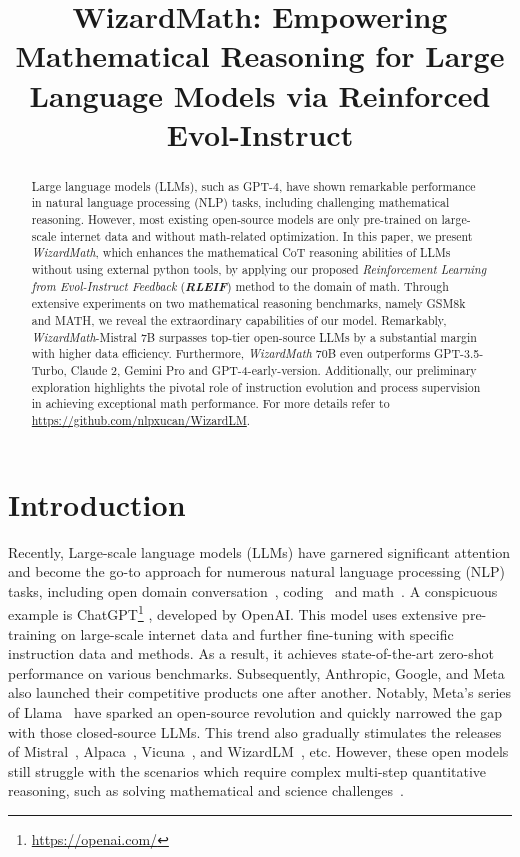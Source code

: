 \title{WizardMath: Empowering Mathematical Reasoning for Large Language Models via Reinforced Evol-Instruct}

\begin{abstract}
Large language models (LLMs), such as GPT-4, have shown remarkable performance in natural language processing (NLP) tasks, including challenging mathematical reasoning. However, most existing open-source models are only pre-trained on large-scale internet data and without math-related optimization. In this paper, we present \emph{WizardMath}, which enhances the mathematical CoT reasoning abilities of LLMs without using external python tools, by applying our proposed \emph{Reinforcement Learning from Evol-Instruct Feedback} (\textbf{\emph{RLEIF}}) method to the domain of math. Through extensive experiments on two mathematical reasoning benchmarks, namely GSM8k and MATH, we reveal the extraordinary capabilities of our model. Remarkably, \emph{WizardMath}-Mistral 7B surpasses top-tier open-source LLMs by a substantial margin with higher data efficiency. Furthermore, \emph{WizardMath} 70B even outperforms GPT-3.5-Turbo, Claude 2, Gemini Pro and GPT-4-early-version. Additionally, our preliminary exploration highlights the pivotal role of instruction evolution and process supervision in achieving exceptional math performance. For more details refer to \url{https://github.com/nlpxucan/WizardLM}.
\end{abstract}

\section{Introduction}

Recently, Large-scale language models (LLMs) have  garnered significant attention and become the go-to approach for numerous natural language processing (NLP) tasks, including open domain conversation~\citep{ouyang2022training,openai2023gpt4,touvron2023llama}, coding~\citep{chen2021evaluating-humaneval,codet5,li2023starcoder} and math~\citep{taylor2022galactica,lewkowycz2022solving, shao2024-deepseekmath, yang2024-qwen2.5-math}. A conspicuous example is ChatGPT\footnote{\quad \url{https://openai.com/}\label{fn:chatgpt}}
, developed by OpenAI. This model uses extensive pre-training on large-scale internet data and further fine-tuning with specific instruction data and methods. As a result, it achieves state-of-the-art zero-shot performance on various benchmarks. Subsequently, Anthropic,  Google, and Meta  also launched their competitive products one after another. Notably, Meta's series of  Llama~\citep{touvron2023llama, touvron2023llama2, dubey2024-llama3} have sparked an open-source revolution and quickly narrowed the gap with those closed-source LLMs. This trend also gradually stimulates the releases of Mistral~\citep{jiang2023mistral}, Alpaca~\citep{alpaca}, Vicuna~\citep{vicuna2023}, and WizardLM~\citep{xu2023wizardlm}, etc. However, these open models still struggle with the scenarios which require  complex multi-step  quantitative reasoning, such as solving mathematical and science challenges~\citep{ahn2024-comprehention-LLM, long2024-llms-survey}. 

